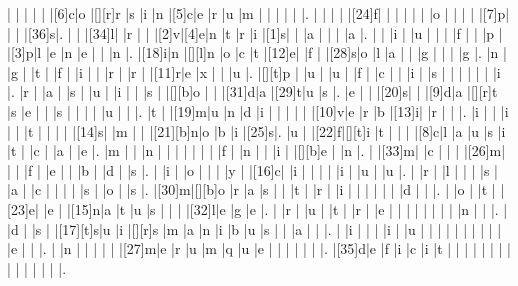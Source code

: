 \documentclass[12pt]{article}
\begin{document}
\begin{Puzzle}{22}{24}
  |{}  |{}  |{}  |{}  |{}  |[6]c|o   |[][r]r   |s   |i   |n   |[5]c|e   |r   |u   |m   |{}  |{}  |{}  |{}  |{}  |.
  |{}  |{}  |{}  |{}  |[24]f|{}  |{}  |{}  |{}  |{}  |{}  |o   |{}  |{}  |{}  |{}  |[7]p|{}  |{}  |{}  |[36]s|.
  |{}  |{}  |[34]l|{}  |r   |{}  |{}  |[2]v|[4]e|n   |t   |r   |i   |[1]s|{}  |{}  |a   |{}  |{}  |{}  |a   |.
  |{}  |{}  |i   |{}  |u   |{}  |{}  |{}  |f   |{}  |{}  |p   |{}  |[3]p|l   |e   |n   |e   |{}  |{}  |n   |.
  |[18]i|n   |[][l]n   |o   |c   |t   |[12]e|{}  |f   |{}  |[28]s|o   |l   |a   |{}  |{}  |g   |{}  |{}  |{}  |g   |.
  |n   |{}  |g   |{}  |t   |{}  |f   |{}  |i   |{}  |{}  |r   |{}  |r   |{}  |[11]r|e   |x   |{}  |{}  |u   |.
  |[][t]p   |{}  |u   |{}  |u   |{}  |f   |{}  |c   |{}  |{}  |i   |{}  |s   |{}  |{}  |{}  |{}  |{}  |{}  |i   |.
  |r   |{}  |a   |{}  |s   |{}  |u   |{}  |i   |{}  |{}  |s   |{}  |[][b]o   |{}  |{}  |[31]d|a   |[29]t|u   |s   |.
  |e   |{}  |{}  |[20]s|{}  |{}  |[9]d|a   |[][r]t   |s   |e   |{}  |{}  |s   |{}  |{}  |{}  |{}  |u   |{}  |{}  |.
  |t   |{}  |[19]m|u   |n   |d   |i   |{}  |{}  |{}  |{}  |{}  |[10]v|e   |r   |b   |[13]i|{}  |r   |{}  |{}  |.
  |i   |{}  |{}  |i   |{}  |{}  |t   |{}  |{}  |{}  |{}  |[14]s|{}  |m   |{}  |{}  |[21][b]n|o   |b   |i   |[25]s|.
  |u   |{}  |[22]f|[][t]i   |t   |{}  |{}  |{}  |[8]c|l   |a   |u   |s   |i   |t   |{}  |c   |{}  |a   |{}  |e   |.
  |m   |{}  |{}  |n   |{}  |{}  |{}  |{}  |{}  |{}  |{}  |f   |{}  |n   |{}  |{}  |i   |{}  |[][b]e   |{}  |n   |.
  |{}  |[33]m|{}  |c   |{}  |{}  |{}  |[26]m|{}  |{}  |{}  |f   |{}  |e   |{}  |{}  |b   |{}  |d   |{}  |s   |.
  |{}  |i   |{}  |o   |{}  |{}  |{}  |y   |{}  |[16]c|{}  |i   |{}  |{}  |{}  |{}  |i   |{}  |u   |{}  |u   |.
  |{}  |r   |{}  |l   |{}  |{}  |{}  |s   |{}  |a   |{}  |c   |{}  |{}  |{}  |{}  |s   |{}  |o   |{}  |s   |.
  |[30]m|[][b]o   |r   |a   |s   |{}  |{}  |t   |{}  |r   |{}  |i   |{}  |{}  |{}  |{}  |{}  |{}  |d   |{}  |{}  |.
  |{}  |o   |{}  |t   |{}  |[23]e|{}  |e   |{}  |[15]n|a   |t   |u   |s   |{}  |{}  |{}  |[32]l|e   |g   |e   |.
  |{}  |r   |{}  |u   |{}  |t   |{}  |r   |{}  |e   |{}  |{}  |{}  |{}  |{}  |{}  |{}  |{}  |n   |{}  |{}  |.
  |{}  |d   |{}  |s   |{}  |[17][t]s|u   |i   |[][r]s   |m   |a   |n   |i   |b   |u   |s   |{}  |{}  |a   |{}  |{}  |.
  |{}  |i   |{}  |{}  |{}  |i   |{}  |u   |{}  |{}  |{}  |{}  |{}  |{}  |{}  |{}  |{}  |{}  |e   |{}  |{}  |.
  |{}  |n   |{}  |{}  |{}  |{}  |{}  |[27]m|e   |r   |u   |m   |q   |u   |e   |{}  |{}  |{}  |{}  |{}  |{}  |.
  |[35]d|e   |f   |i   |c   |i   |t   |{}  |{}  |{}  |{}  |{}  |{}  |{}  |{}  |{}  |{}  |{}  |{}  |{}  |{}  |.
\end{Puzzle}
\end{document}
